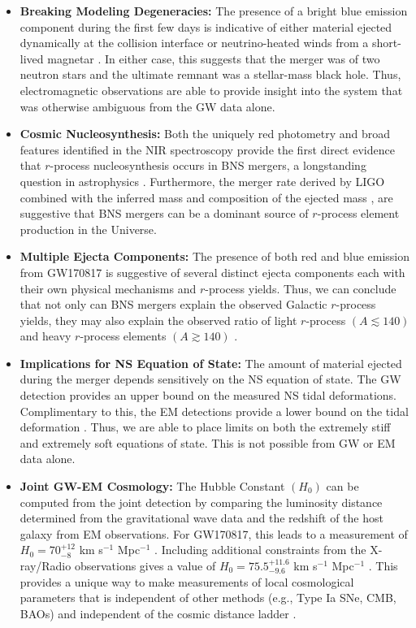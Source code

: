 \begin{itemize}
\item {\bf Breaking Modeling Degeneracies:} The presence of a bright blue emission component during the first few days is indicative of either material ejected dynamically at the collision interface \citep{Nicholl+17a} or neutrino-heated winds from a short-lived magnetar \citep{Metzger+18}. In either case, this suggests that the merger was of two neutron stars and the ultimate remnant was a stellar-mass black hole. Thus, electromagnetic observations are able to provide insight into the system that was otherwise ambiguous from the GW data alone.
\item {\bf Cosmic Nucleosynthesis:} Both the uniquely red photometry \citep{Cowp+17} and broad features identified in the NIR spectroscopy \citep{Chornock+17} provide the first direct evidence that $r$-process nucleosynthesis occurs in BNS mergers, a longstanding question in astrophysics \citep{LattimerSchramm74,Lattimer+77}. Furthermore, the merger rate derived by LIGO \citep{LIGOGW170817} combined with the inferred mass and composition of the ejected mass \citep{Cowp+17,Villar+17b}, are suggestive that BNS mergers can be a dominant source of $r$-process element production in the Universe.
\item {\bf Multiple Ejecta Components:} The presence of both red and blue emission from GW170817 is suggestive of several distinct ejecta components each with their own physical mechanisms and $r$-process yields. Thus, we can conclude that not only can BNS mergers explain the observed Galactic $r$-process yields, they may also explain the observed ratio of light $r$-process $(A \lesssim 140)$ and heavy $r$-process elements $(A \gtrsim 140)$ \citep{Cowp+17,Kasen+17}.
\item {\bf Implications for NS Equation of State:} The amount of material ejected during the merger depends sensitively on the NS equation of state. The GW detection provides an upper bound on the measured NS tidal deformations. Complimentary to this, the EM detections provide a lower bound on the tidal deformation \citep{Radice+18}. Thus, we are able to place limits on both the extremely stiff and extremely soft equations of state. This is not possible from GW or EM data alone.
\item {\bf Joint GW-EM Cosmology:} The Hubble Constant $(H_0)$ can be computed from the joint detection by comparing the luminosity distance determined from the gravitational wave data and the redshift of the host galaxy from EM observations. For GW170817, this leads to a measurement of $H_0 = 70^{+12}_{-8}$ km s$^{-1}$ Mpc$^{-1}$ \citep{LIGOH0}. Including additional constraints from the X-ray/Radio observations gives a value of $H_0 = 75.5^{+11.6}_{-9.6}$ km s$^{-1}$ Mpc$^{-1}$ \citep{Guidorzi+17}. This provides a unique way to make measurements of local cosmological parameters that is independent of other methods (e.g., Type Ia SNe, CMB, BAOs) and independent of the cosmic distance ladder \citep{Schutz1986,HolzHughes05}.
\end{itemize}

